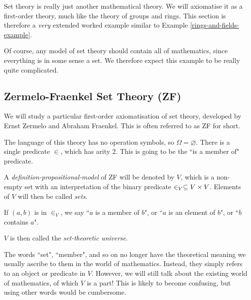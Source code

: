 \documentclass{article}
\begin{document}
Set theory is really just another mathematical theory. We will axiomatise it as a first-order theory, much like the theory of groups and rings. This section is therefore a \textit{very} extended worked example similar to Example \ref{rings-and-fields-example}.

\begin{note}
	Of course, any model of set theory should contain all of mathematics, since everything is in some sense a set. We therefore expect this example to be really quite complicated.
\end{note}


\subsection{Zermelo-Fraenkel Set Theory (ZF)}
\label{section-set-theory-zf}

We will study a particular first-order axiomatisation of set theory, developed by Ernst Zermelo and Abraham Fraenkel. This is often referred to as ZF for short.

The language of this theory has no operation symbols, so $\Omega = \varnothing$. There is a single predicate $\in$, which has arity 2. This is going to be the ``is a member of" predicate.

\begin{definition}
    A \textit{definition-propositional-model} of ZF will be denoted by $V$, which is a non-empty set with an interpretation of the binary predicate $\in_V \subseteq V \times V$. Elements of $V$ will then be called \textit{sets}.

	If $(a, b)$ is in $\in_V$, we say ``$a$ is a member of $b$", or ``$a$ is an element of $b$", or ``$b$ contains $a$".
	
	$V$ is then called the \textit{set-theoretic universe}.
\end{definition}

\begin{note}
	The words ``set", ``member", and so on no longer have the theoretical meaning we usually ascribe to them in the world of mathematics. Instead, they simply refers to an object or predicate in $V$. However, we will still talk about the existing world of mathematics, of which $V$ is a part! This is likely to become confusing, but using other words would be cumbersome.
\end{note}
\end{document}
